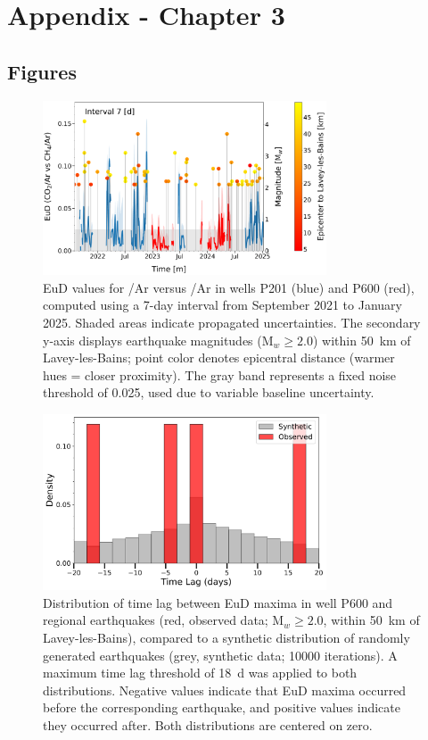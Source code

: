 \chapter{Appendix - Chapter 3}
\label{ch:appendix_ch3}

\section{Figures}

\begin{figure}[H]
    \centering
    \includegraphics[width=0.75\textwidth]{chapters/06_appendix/SI_C3/full_EuD_7.pdf}
    \caption{
    EuD values for /Ar versus /Ar in wells P201 (blue) and P600 (red), computed using a 7-day interval from September 2021 to January 2025.
    Shaded areas indicate propagated uncertainties.
    The secondary y-axis displays earthquake magnitudes (M$_w \geq 2.0$) within \SI{50}{\kilo\meter} of Lavey-les-Bains; point color denotes epicentral distance (warmer hues = closer proximity).
    The gray band represents a fixed noise threshold of 0.025, used due to variable baseline uncertainty.
    }
    \label{figSI:full_EuD_EuD7}
\end{figure}

\begin{figure}[H]
    \centering
    \includegraphics[width=0.75\textwidth]{chapters/06_appendix/SI_C3/distribution_earthquakes_wo_outliers_well_600.pdf}
    \caption{
    Distribution of time lag between EuD maxima in well P600 and regional earthquakes (red, observed data; M$_w \geq 2.0$, within \SI{50}{\kilo\meter} of Lavey-les-Bains), compared to a synthetic distribution of randomly generated earthquakes (grey, synthetic data; \num{10000} iterations).
    A maximum time lag threshold of \SI{18}{\day} was applied to both distributions.
    Negative values indicate that EuD maxima occurred before the corresponding earthquake, and positive values indicate they occurred after.
    Both distributions are centered on zero.
    }
    \label{figSI:distributions_P600}
\end{figure}